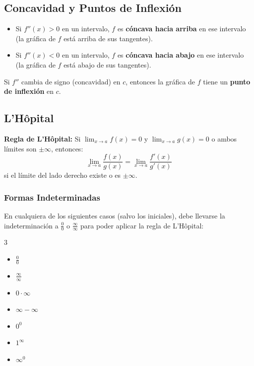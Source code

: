 \documentclass[a4paper,12pt]{article}
\theoremstyle{definition}
\begin{document}
\subsection{Concavidad y Puntos de Inflexión}
\begin{itemize}
    \item Si $f''(x) > 0$ en un intervalo, $f$ es \textbf{cóncava hacia arriba} en ese intervalo (la gráfica de $f$ está arriba de sus tangentes).
    \item Si $f''(x) < 0$ en un intervalo, $f$ es \textbf{cóncava hacia abajo} en ese intervalo (la gráfica de $f$ está abajo de sus tangentes).
\end{itemize}

\begin{tcolorbox}
Si $f''$ cambia de signo (concavidad) en $c$, entonces la gráfica de $f$ tiene un \textbf{punto de inflexión} en $c$.
\end{tcolorbox}

\subsection{L'Hôpital}
\textbf{Regla de L'Hôpital:} Si $\lim_{x \to a} f(x) = 0$ y $\lim_{x \to a} g(x) = 0$ o ambos límites son $\pm \infty$, entonces:
\[ \lim_{x \to a} \frac{f(x)}{g(x)} = \lim_{x \to a} \frac{f'(x)}{g'(x)} \]
si el límite del lado derecho existe o es $\pm \infty$.

\subsubsection{Formas Indeterminadas}
En cualquiera de los siguientes casos (salvo los iniciales), debe llevarse la indeterminación a $\frac{0}{0}$ o $\frac{\infty}{\infty}$ para poder aplicar la regla de L'Hôpital:
\begin{multicols}{3}
\begin{itemize}
    \item $\frac{0}{0}$
    \item $\frac{\infty}{\infty}$
    \item $0 \cdot \infty$
    \item $\infty - \infty$
    \item $0^0$
    \item $1^\infty$
    \item $\infty^0$
\end{itemize}
\end{multicols}
\end{document}
